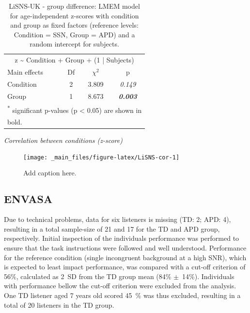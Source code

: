 \documentclass[a4paper, twoside]{templates/ociamthesis}
\begin{document}
\begin{table}

\caption{\label{tab:LiSNS-zLMEM}LiSNS-UK - group difference: LMEM model for age-independent z-scores with condition and group as fixed factors (reference levels: Condition = SSN, Group = APD) and a random intercept for subjects.}
\centering
\begin{tabular}[t]{lcc>{}c}
\toprule
\multicolumn{4}{c}{z \textasciitilde{} Condition + Group + (1 | Subjects)} \\
\cmidrule(l{3pt}r{3pt}){1-4}
Main effects & Df & $\chi^{2}$ & p\\
\midrule
Condition & 2 & 3.809 & \em{0.149}\\
Group & 1 & 8.673 & \em{\textbf{0.003}}\\
\bottomrule
\multicolumn{4}{l}{\textsuperscript{*} significant p-values (p < 0.05) are shown in}\\
\multicolumn{4}{l}{bold.}\\
\end{tabular}
\end{table}

\colorbox[HTML]{CCCCFF}{\emph{Correlation between conditions (z-score)}}

\begin{figure}

{\centering \texttt{[image: \_main\_files/figure-latex/LiSNS-cor-1]} 

}

\caption{Add caption here.}\label{fig:LiSNS-cor}
\end{figure}

\hypertarget{envasa}{%
\subsection{ENVASA}\label{envasa}}

Due to technical problems, data for six listeners is missing (TD: 2; APD: 4), resulting in a total sample-size of 21 and 17 for the TD and APD group, respectively. Initial inspection of the individuals performance was performed to ensure that the task instructions were followed and well understood. Performance for the reference condition (single incongruent background at a high SNR), which is expected to least impact performance, was compared with a cut-off criterion of 56\%, calculated as 2~SD from the TD group mean (84\% \(\pm\)~14\%). Individuals with performance bellow the cut-off criterion were excluded from the analysis. One TD listener aged 7 years old scored 45~\% was thus excluded, resulting in a total of 20 listeners in the TD group.
\end{document}
